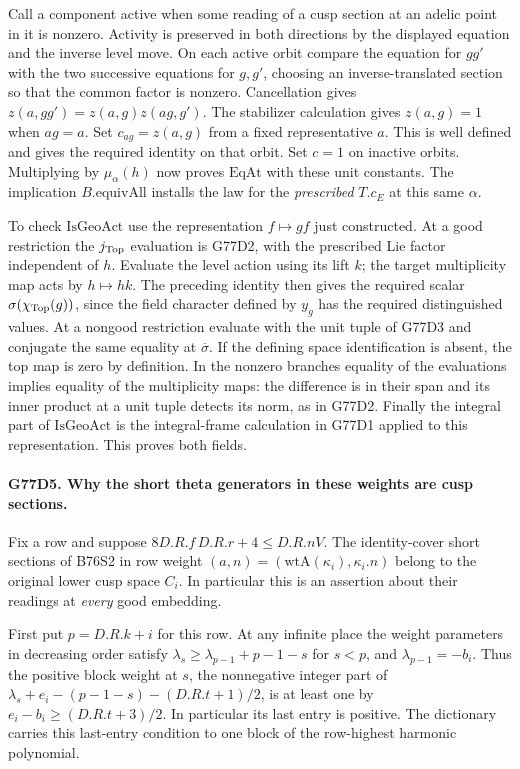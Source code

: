 Call a component active when some reading of a cusp section at an
adelic point in it is nonzero. Activity is preserved in both
directions by the displayed equation and the inverse level move.
On each active orbit compare the equation for $gg'$ with the two
successive equations for $g,g'$, choosing an inverse-translated
section so that the common factor is nonzero. Cancellation gives
$z(a,gg')=z(a,g)z(ag,g')$. The stabilizer calculation gives
$z(a,g)=1$ when $ag=a$. Set $c_{ag}=z(a,g)$ from a fixed
representative $a$. This is well defined and gives the required
identity on that orbit. Set $c=1$ on inactive orbits. Multiplying
by $\mu_\alpha(h)$ now proves $\mathrm{EqAt}$ with these unit
constants. The implication $B.\mathrm{equivAll}$ installs the
law for the \emph{prescribed} $T.c_E$ at this same $\alpha$.

To check $\mathrm{IsGeoAct}$ use the representation $f\mapsto
gf$ just constructed. At a good restriction the $j_{\rm Top}$
evaluation is G77D2, with the prescribed Lie factor independent of
$h$. Evaluate the level action using its lift $k$; the target
multiplicity map acts by $h\mapsto hk$. The preceding identity
then gives the required scalar $\sigma(\chi_{\rm Top}(g))$,
since the field character defined by $y_g$ has the required
distinguished values. At a nongood restriction evaluate with
the unit tuple of G77D3 and conjugate the same equality at
$\overline\sigma$. If the defining space identification is absent,
the top map is zero by definition. In the nonzero branches equality
of the evaluations implies equality of the multiplicity maps:
the difference is in their span and its inner product at a unit
tuple detects its norm, as in G77D2. Finally the integral part
of $\mathrm{IsGeoAct}$ is the integral-frame calculation in
G77D1 applied to this representation. This proves both fields.

\paragraph{G77D5. Why the short theta generators in these weights are cusp sections.}
Fix a row and suppose $8D.R.f\,D.R.r+4\le D.R.nV$.
The identity-cover short sections of B76S2 in row weight
$(a,n)=(\mathrm{wtA}(\kappa_i),\kappa_i.n)$ belong to the original
lower cusp space $C_i$. In particular this is an assertion about
their readings at \emph{every} good embedding.

First put $p=D.R.k+i$ for this row. At any infinite place the
weight parameters in decreasing order satisfy
$\lambda_s\ge\lambda_{p-1}+p-1-s$ for $s<p$, and
$\lambda_{p-1}=-b_i$. Thus the positive block weight at $s$,
the nonnegative integer part of
$\lambda_s+e_i-(p-1-s)-(D.R.t+1)/2$, is at least one by
$e_i-b_i\ge(D.R.t+3)/2$. In particular its last entry is
positive. The dictionary carries this last-entry condition to
one block of the row-highest harmonic polynomial.


